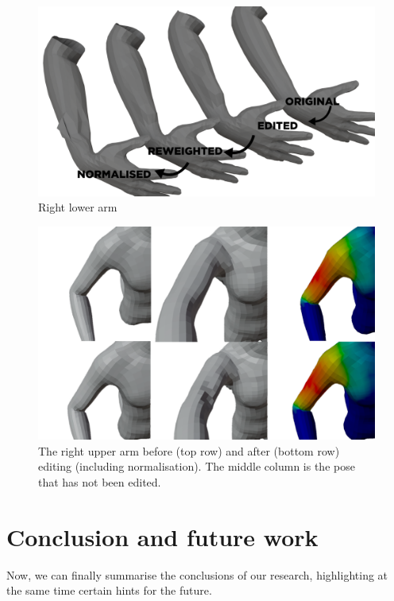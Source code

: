 \documentclass[12pt,twoside]{report}
\begin{document}
\begin{figure}[hp]
    \centering
    \includegraphics[width=65ex]{graphics/result_lowerarm_r.png}
    \caption{Right lower arm}
    \label{fig:result_lowerarm_r}
\end{figure}

\begin{figure}[hp]
    \centering
    \includegraphics[width=\textwidth]{graphics/optimisation_poses.png}
    \caption[The right upper arm before and after editing]{The right upper arm before (top row) and after (bottom row) editing (including normalisation). The middle column is the pose that has not been edited.}
    \label{fig:optimisation_poses}
\end{figure}

\chapter{Conclusion and future work}

Now, we can finally summarise the conclusions of our research, highlighting at the same time certain hints for the future.
\end{document}
